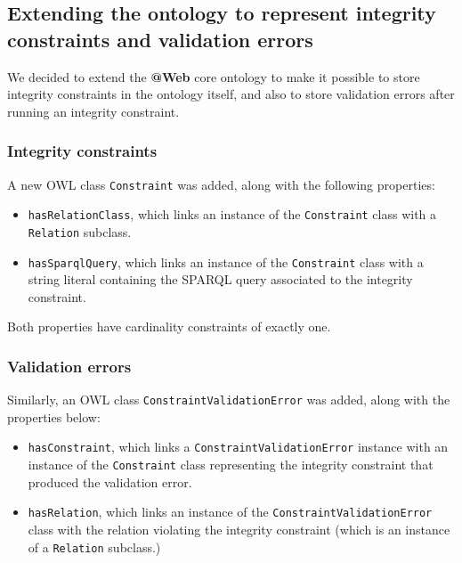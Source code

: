\documentclass[a4paper, 10pt]{article}
\makeatletter
\newcommand{\atweb}{\textbf{@Web}\xspace}
\newcommand{\code}[1]{\texttt{#1}}
\makeatother
\begin{document}
\subsection{Extending the ontology to represent integrity constraints and
validation errors}

We decided to extend the \atweb core ontology to make it possible to store
integrity constraints in the ontology itself, and also to store validation
errors after running an integrity constraint.


\subsubsection{Integrity constraints}

A new OWL class \code{Constraint} was added, along with the following
properties:

\begin{itemize}
  \item \code{hasRelationClass}, which links an instance of the
    \code{Constraint} class with a \code{Relation} subclass.

  \item \code{hasSparqlQuery}, which links an instance of the \code{Constraint}
    class with a string literal containing the SPARQL query associated to the
    integrity constraint.
\end{itemize}

Both properties have cardinality constraints of exactly one.


\subsubsection{Validation errors}

Similarly, an OWL class \code{ConstraintValidationError} was added, along with
the properties below:

\begin{itemize}
  \item \code{hasConstraint}, which links a \code{ConstraintValidationError}
    instance with an instance of the \code{Constraint} class representing the
    integrity constraint that produced the validation error.

  \item \code{hasRelation}, which links an instance of the
    \code{ConstraintValidationError} class with the relation violating the
    integrity constraint (which is an instance of a \code{Relation} subclass.)
\end{itemize}
\end{document}

